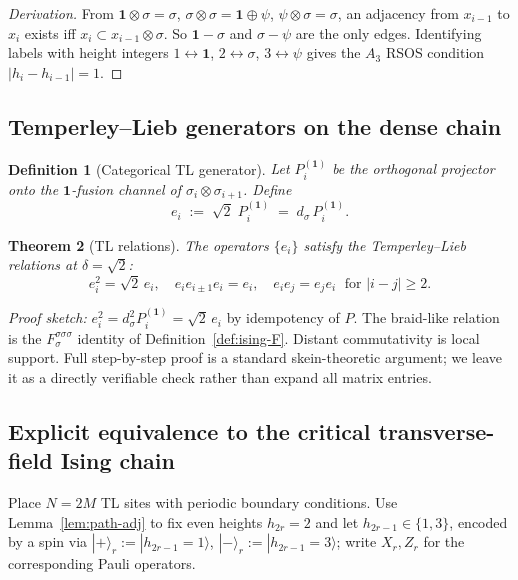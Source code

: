 \documentclass[11pt,a4paper]{article}
\newtheorem{definition}{Definition}[section]
\newtheorem{theorem}[definition]{Theorem}
\theoremstyle{definition}
\newcommand{\one}{\mathbf{1}}
\begin{document}
\begin{proof}[Derivation]
From $\one\otimes\sigma=\sigma$, $\sigma\otimes\sigma=\one\oplus\psi$,
$\psi\otimes\sigma=\sigma$, an adjacency from $x_{i-1}$ to $x_i$ exists iff
$x_i\subset x_{i-1}\otimes\sigma$. So $\one\!-\!\sigma$ and $\sigma\!-\!\psi$
are the only edges. Identifying labels with height integers
$1\leftrightarrow\one$, $2\leftrightarrow\sigma$,
$3\leftrightarrow\psi$ gives the $A_3$ RSOS condition $|h_i-h_{i-1}|=1$.
\end{proof}

\subsection{Temperley--Lieb generators on the dense chain}

\begin{definition}[Categorical TL generator]\label{def:TL-cat}
Let $P_{i}^{(\one)}$ be the orthogonal projector onto the
$\one$-fusion channel of $\sigma_i\otimes\sigma_{i+1}$. Define
\[
e_i \;:=\; \sqrt 2 \;P_i^{(\one)} \;=\; d_\sigma\,P_i^{(\one)}.
\]
\end{definition}

\begin{theorem}[TL relations]\label{thm:TL-rel}
The operators $\{e_i\}$ satisfy the Temperley--Lieb relations at
$\delta = \sqrt 2$:
\[
e_i^{2} = \sqrt 2\,e_i, \quad e_i e_{i\pm1} e_i = e_i, \quad
e_i e_j = e_j e_i \;\text{ for } |i-j|\ge 2.
\]
\end{theorem}
\noindent\textit{Proof sketch:} $e_i^{2}=d_\sigma^{2}P_i^{(\one)}=\sqrt 2\,e_i$
by idempotency of $P$. The braid-like relation is the $F^{\sigma\sigma\sigma}_\sigma$
identity of Definition~\ref{def:ising-F}. Distant commutativity is local
support. Full step-by-step proof is a standard skein-theoretic argument; we
leave it as a directly verifiable check rather than expand all matrix entries.

\subsection{Explicit equivalence to the critical transverse-field Ising chain}

Place $N=2M$ TL sites with periodic boundary conditions. Use Lemma~\ref{lem:path-adj}
to fix even heights $h_{2r}=2$ and let $h_{2r-1}\in\{1,3\}$, encoded by a
spin via $|+\rangle_r := |h_{2r-1}=1\rangle$, $|-\rangle_r := |h_{2r-1}=3\rangle$;
write $X_r,Z_r$ for the corresponding Pauli operators.
\end{document}
